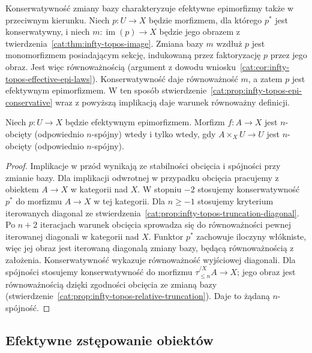 \begin{uwaga}\label{cat:rem:infty-topos-epi-conservative-converse}
Konserwatywność zmiany bazy charakteryzuje efektywne epimorfizmy także w przeciwnym kierunku. Niech $p:U\to X$ będzie morfizmem, dla którego $p^*$ jest konserwatywny, i niech $m:\operatorname{im}(p)\to X$ będzie jego obrazem z twierdzenia~\ref{cat:thm:infty-topos-image}. Zmiana bazy $m$ wzdłuż $p$ jest monomorfizmem posiadającym sekcję, indukowaną przez faktoryzację $p$ przez jego obraz. Jest więc równoważnością (argument z dowodu wniosku~\ref{cat:cor:infty-topos-effective-epi-laws}). Konserwatywność daje równoważność $m$, a zatem $p$ jest efektywnym epimorfizmem. W ten sposób stwierdzenie~\ref{cat:prop:infty-topos-epi-conservative} wraz z powyższą implikacją daje warunek równoważny definicji.
\end{uwaga}

\begin{wniosek}\label{cat:cor:infty-topos-local-truncation}
Niech $p:U\to X$ będzie efektywnym epimorfizmem. Morfizm $f:A\to X$ jest $n$-obcięty (odpowiednio $n$-spójny) wtedy i tylko wtedy, gdy $A\times_X U\to U$ jest $n$-obcięty (odpowiednio $n$-spójny).
\end{wniosek}
\begin{proof}
Implikacje w przód wynikają ze stabilności obcięcia i spójności przy zmianie bazy. Dla implikacji odwrotnej w przypadku obcięcia pracujemy z obiektem $A\to X$ w kategorii nad $X$. W stopniu $-2$ stosujemy konserwatywność $p^*$ do morfizmu $A\to X$ w tej kategorii. Dla $n\geq-1$ stosujemy kryterium iterowanych diagonal ze stwierdzenia~\ref{cat:prop:infty-topos-truncation-diagonal}. Po $n+2$ iteracjach warunek obcięcia sprowadza się do równoważności pewnej iterowanej diagonali w kategorii nad $X$. Funktor $p^*$ zachowuje iloczyny włókniste, więc jej obraz jest iterowaną diagonalą zmiany bazy, będącą równoważnością z założenia. Konserwatywność wykazuje równoważność wyjściowej diagonali. Dla spójności stosujemy konserwatywność do morfizmu $\tau_{\leq n}^{/X}A\to X$; jego obraz jest równoważnością dzięki zgodności obcięcia ze zmianą bazy (stwierdzenie~\ref{cat:prop:infty-topos-relative-truncation}). Daje to żądaną $n$-spójność.
\end{proof}

\subsection{Efektywne zstępowanie obiektów}

